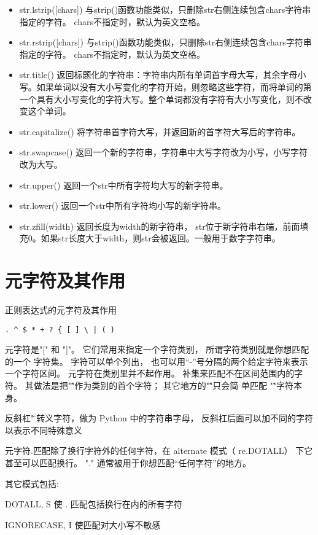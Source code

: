 \documentclass[twoside,11pt]{book}
\begin{document}
\begin{itemize}
  \item str.lstrip([chars]) 与strip()函数功能类似，只删除str右侧连续包含chars字符串指定的字符。 chars不指定时，默认为英文空格。
  \item str.rstrip([chars]) 与strip()函数功能类似，只删除str右侧连续包含chars字符串指定的字符。 chars不指定时，默认为英文空格。

  \item str.title() 返回标题化的字符串：字符串内所有单词首字母大写，其余字母小写。如果单词以没有大小写变化的字符开始，则忽略这些字符，而将单词的第一个具有大小写变化的字符大写。整个单词都没有字符有大小写变化，则不改变这个单词。
  \item str.capitalize() 将字符串首字符大写，并返回新的首字符大写后的字符串。
  \item str.swapcase() 返回一个新的字符串，字符串中大写字符改为小写，小写字符改为大写。
  \item str.upper() 返回一个str中所有字符均大写的新字符串。
  \item str.lower() 返回一个str中所有字符均小写的新字符串。
  \item str.zfill(width) 返回长度为width的新字符串， str位于新字符串右端，前面填充0。如果str长度大于width，则str会被返回。一般用于数字字符串。
\end{itemize}

\section{元字符及其作用}
正则表达式的元字符及其作用
\begin{lstlisting}
. ^ $ * + ? { [ ] \ | ( )
\end{lstlisting}

元字符是"[" 和 "]"。 它们常用来指定一个字符类别， 所谓字符类别就是你想匹配的一个
字符集。 字符可以单个列出， 也可以用“-”号分隔的两个给定字符来表示一个字符区间。
元字符在类别里并不起作用。 补集来匹配不在区间范围内的字符。 其做法是把"\^"作为类别的首个字符； 其它地方的"\^"只会简
单匹配 "\^"字符本身。

反斜杠"\"是转义字符，做为 Python 中的字符串字母， 反斜杠后面可以加不同的字符以表示不同特殊意义

元字符.匹配除了换行字符外的任何字符，在 alternate 模式（ re.DOTALL） 下它
甚至可以匹配换行。 "." 通常被用于你想匹配“任何字符”的地方。

其它模式包括:

DOTALL, S 使 . 匹配包括换行在内的所有字符

IGNORECASE, I 使匹配对大小写不敏感
\end{document}
